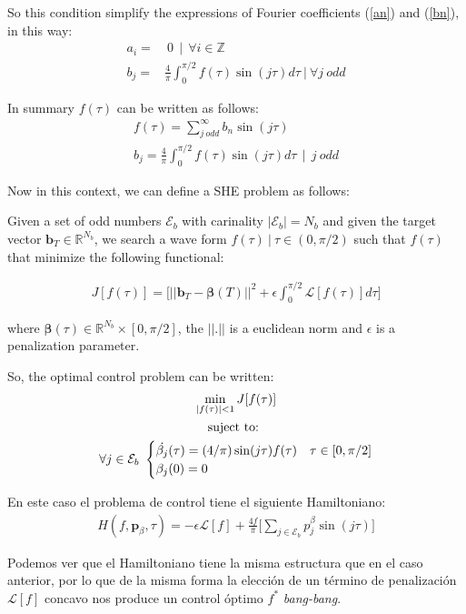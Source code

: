 So this condition simplify the expressions of Fourier coefficients (\ref{an}) and (\ref{bn}), in this way:
\begin{align}
    a_i = & \  0 \ \ | \  \ \forall i \in \mathbb{Z} \\
    b_j = &  \frac{4}{\pi} \int_0^{\pi/2} f(\tau ) \sin(j\tau)d\tau \ | \ \forall j \ odd
\end{align}

In summary $f(\tau )$ can be written as follows:
\begin{gather}
    f(\tau ) = \sum_{j \ odd}^\infty  b_n \sin(j \tau) \\
    b_j = \frac{4}{\pi}\int_0^{\pi/2} f(\tau ) \sin(j\tau)d\tau \ \ | \ \ j \ odd \label{bn_odd}
\end{gather}


Now in this context, we can define a SHE problem as follows:


\begin{problem}\label{OCP_bn}
    Given  a set of odd numbers $\mathcal{E}_b$ with carinality $|\mathcal{E}_b| = N_b$ and given the target vector $\bm{b}_T  \in \mathbb{R}^{N_b}$, we search a wave form $f(\tau ) \ | \ \tau \in (0,\pi/2)$ such that $f(\tau)$ that minimize the following functional:

        \begin{gather}
        J[f(\tau)] = \Bigg[ || \bm{b}_T - \bm{\beta}(T)||^2 + \epsilon \int_0^{\pi/2} \mathcal{L}[f(\tau)] d\tau \Bigg] 
    \end{gather}

    where $ \bm{\beta}(\tau) \in \mathbb{R}^{N_b} \times [0,\pi/2] $, the $||.||$ is a euclidean norm and $\epsilon$ is a penalization parameter.
    \newline

    So, the optimal control problem can be written: 
    \begin{gather}
        \min_{|f(\tau) |<1} J[f(\tau)] \\
        \notag \text{suject to: } \\
        \notag \forall j \in \mathcal{E}_b \
        \begin{cases}
            \dot{\beta_j}(\tau) = (4/\pi) \sin(j\tau) f(\tau) & \tau \in [0,\pi/2]\label{dyn}\\
            \beta_j(0) = 0
        \end{cases} 
    \end{gather}
\end{problem}

En este caso el problema de control tiene el siguiente Hamiltoniano:
\begin{gather}
    H(f,\bm{p}_\beta,\tau) = -\epsilon  \mathcal{L}[f]+ 
    \frac{4f}{\pi} \Bigg[ 
        \sum_{j \in \mathcal{E}_b} p^\beta_j \sin(j\tau) 
    \Bigg]
\end{gather}

Podemos ver que el Hamiltoniano tiene la misma estructura que en el caso anterior, por lo que de la misma forma la elección de un término de penalización $\mathcal{L}[f]$ concavo nos produce un control óptimo $f^*$ \emph{bang-bang}.

